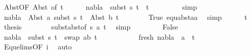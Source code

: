 \begin{isabellebody}
\ Abst{\isacharparenleft}{\kern0pt}{}{\isacharparenright}{\kern0pt}{\isacharbrackleft}{\kern0pt}OF\ Abst{\isacharparenleft}{\kern0pt}{}{\isacharparenright}{\kern0pt}{\isacharcomma}{\kern0pt}\ of\ t{}{\isacharprime}{\kern0pt}{\isacharbrackright}{\kern0pt}\isanewline
\ \ \ \ \isamarkupfalse%
\ {\isachardoublequoteopen}nabla\ {\isasymturnstile}\ subst\ s{}\ t{}{\isacharprime}{\kern0pt}\ {\isasymapprox}\ t{}{\isacharprime}{\kern0pt}{\isachardoublequoteclose}\ \isanewline
\ \ \ \ \ \ \isamarkupfalse%
\ simp\isanewline
\ \ \ \ \isamarkupfalse%
\ {\isachardoublequoteopen}nabla\ {\isasymturnstile}\ Abst\ a\ {\isacharparenleft}{\kern0pt}subst\ s{}\ t{}{\isacharprime}{\kern0pt}{\isacharparenright}{\kern0pt}\ {\isasymapprox}\ Abst\ b\ t{}{\isacharprime}{\kern0pt}{\isachardoublequoteclose}\isanewline
\ \ \ \ \ \ \isamarkupfalse%
\ True\ equ{\isacharunderscore}{\kern0pt}abst{\isacharunderscore}{\kern0pt}aa\ \isamarkupfalse%
\ simp\isanewline
\ \ \ \ \isamarkupfalse%
\ t{}\ \isamarkupfalse%
\ {\isacharquery}{\kern0pt}thesis\isanewline
\ \ \ \ \ \ \isamarkupfalse%
\ subst{\isacharunderscore}{\kern0pt}abst{\isacharbrackleft}{\kern0pt}of\ s{}\ a\ t{}{\isacharprime}{\kern0pt}{\isacharbrackright}{\kern0pt}\ \isamarkupfalse%
\ simp\isanewline
\ \ \isamarkupfalse%
\isanewline
\ \ \ \ \isamarkupfalse%
\ False\isanewline
\ \ \ \ \isamarkupfalse%
\ {\isachardoublequoteopen}nabla\ {\isasymturnstile}\ {\isacharparenleft}{\kern0pt}subst\ s{}\ t{}{\isacharprime}{\kern0pt}{\isacharparenright}{\kern0pt}\ {\isasymapprox}\ swap\ {\isacharbrackleft}{\kern0pt}{\isacharparenleft}{\kern0pt}a{\isacharcomma}{\kern0pt}b{\isacharparenright}{\kern0pt}{\isacharbrackright}{\kern0pt}\ t{}{\isacharprime}{\kern0pt}{\isachardoublequoteclose}\isanewline
\ \ \ \ \ \ \ \ \ \ \ fresh{\isacharcolon}{\kern0pt}\ {\isachardoublequoteopen}nabla\ {\isasymturnstile}\ a\ {\isasymsharp}\ t{}{\isacharprime}{\kern0pt}{\isachardoublequoteclose}\isanewline
\ \ \ \ \ \ \isamarkupfalse%
\ Equ{\isacharunderscore}{\kern0pt}elims{\isacharparenleft}{\kern0pt}{}{\isacharparenright}{\kern0pt}{\isacharbrackleft}{\kern0pt}OF\ i{\isacharbrackright}{\kern0pt}\ \isamarkupfalse%
\ auto\isanewline

\end{isabellebody}
